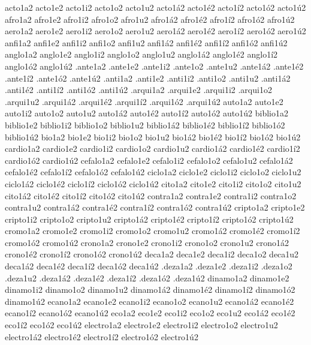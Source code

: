 {{acto1a2 acto1e2 acto1i2 acto1o2 acto1u2 acto1^^e12 acto1^^e92 acto1^^ed2 acto1^^f32 acto1^^fa2 
afro1a2 afro1e2 afro1i2 afro1o2 afro1u2 afro1^^e12 afro1^^e92 afro1^^ed2 afro1^^f32 afro1^^fa2 
aero1a2 aero1e2 aero1i2 aero1o2 aero1u2 aero1^^e12 aero1^^e92 aero1^^ed2 aero1^^f32 aero1^^fa2 
anfi1a2 anfi1e2 anfi1i2 anfi1o2 anfi1u2 anfi1^^e12 anfi1^^e92 anfi1^^ed2 anfi1^^f32 anfi1^^fa2 
anglo1a2 anglo1e2 anglo1i2 anglo1o2 anglo1u2 anglo1^^e12 anglo1^^e92 anglo1^^ed2 anglo1^^f32 anglo1^^fa2 
.ante1a2 .ante1e2 .ante1i2 .ante1o2 .ante1u2 .ante1^^e12 .ante1^^e92 .ante1^^ed2 .ante1^^f32 .ante1^^fa2 
.anti1a2 .anti1e2 .anti1i2 .anti1o2 .anti1u2 .anti1^^e12 .anti1^^e92 .anti1^^ed2 .anti1^^f32 .anti1^^fa2 
.arqui1a2 .arqui1e2 .arqui1i2 .arqui1o2 .arqui1u2 .arqui1^^e12 .arqui1^^e92 .arqui1^^ed2 .arqui1^^f32 .arqui1^^fa2 
auto1a2 auto1e2 auto1i2 auto1o2 auto1u2 auto1^^e12 auto1^^e92 auto1^^ed2 auto1^^f32 auto1^^fa2 
biblio1a2 biblio1e2 biblio1i2 biblio1o2 biblio1u2 biblio1^^e12 biblio1^^e92 biblio1^^ed2 biblio1^^f32 biblio1^^fa2 
bio1a2 bio1e2 bio1i2 bio1o2 bio1u2 bio1^^e12 bio1^^e92 bio1^^ed2 bio1^^f32 bio1^^fa2 
cardio1a2 cardio1e2 cardio1i2 cardio1o2 cardio1u2 cardio1^^e12 cardio1^^e92 cardio1^^ed2 cardio1^^f32 cardio1^^fa2 
cefalo1a2 cefalo1e2 cefalo1i2 cefalo1o2 cefalo1u2 cefalo1^^e12 cefalo1^^e92 cefalo1^^ed2 cefalo1^^f32 cefalo1^^fa2 
ciclo1a2 ciclo1e2 ciclo1i2 ciclo1o2 ciclo1u2 ciclo1^^e12 ciclo1^^e92 ciclo1^^ed2 ciclo1^^f32 ciclo1^^fa2 
cito1a2 cito1e2 cito1i2 cito1o2 cito1u2 cito1^^e12 cito1^^e92 cito1^^ed2 cito1^^f32 cito1^^fa2 
contra1a2 contra1e2 contra1i2 contra1o2 contra1u2 contra1^^e12 contra1^^e92 contra1^^ed2 contra1^^f32 contra1^^fa2 
cripto1a2 cripto1e2 cripto1i2 cripto1o2 cripto1u2 cripto1^^e12 cripto1^^e92 cripto1^^ed2 cripto1^^f32 cripto1^^fa2 
cromo1a2 cromo1e2 cromo1i2 cromo1o2 cromo1u2 cromo1^^e12 cromo1^^e92 cromo1^^ed2 cromo1^^f32 cromo1^^fa2 
crono1a2 crono1e2 crono1i2 crono1o2 crono1u2 crono1^^e12 crono1^^e92 crono1^^ed2 crono1^^f32 crono1^^fa2 
deca1a2 deca1e2 deca1i2 deca1o2 deca1u2 deca1^^e12 deca1^^e92 deca1^^ed2 deca1^^f32 deca1^^fa2 
.deza1a2 .deza1e2 .deza1i2 .deza1o2 .deza1u2 .deza1^^e12 .deza1^^e92 .deza1^^ed2 .deza1^^f32 .deza1^^fa2 
dinamo1a2 dinamo1e2 dinamo1i2 dinamo1o2 dinamo1u2 dinamo1^^e12 dinamo1^^e92 dinamo1^^ed2 dinamo1^^f32 dinamo1^^fa2 
ecano1a2 ecano1e2 ecano1i2 ecano1o2 ecano1u2 ecano1^^e12 ecano1^^e92 ecano1^^ed2 ecano1^^f32 ecano1^^fa2 
eco1a2 eco1e2 eco1i2 eco1o2 eco1u2 eco1^^e12 eco1^^e92 eco1^^ed2 eco1^^f32 eco1^^fa2 
electro1a2 electro1e2 electro1i2 electro1o2 electro1u2 electro1^^e12 electro1^^e92 electro1^^ed2 electro1^^f32 electro1^^fa2 
}}
